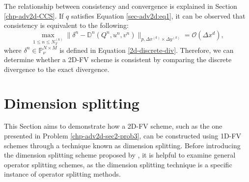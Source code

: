 The relationship between consistency and convergence is explained in Section \ref{chp-adv2d-CCS}.
If $q$ satisfies Equation \eqref{sec-adv2d:eq1}, it can be observed that consistency is equivalent to the following:
\begin{equation*}
	{\max_{1\leq n\leq N_T^{(k)}}}{\|\delta^n - \mathbb{D}^n(Q^n,u^n,v^n)\|_{p,\Delta x^{(k)} \times \Delta y^{(k)}}} = \mathcal{O}(\Delta x^d),
\end{equation*}
where $\delta^n \in \mathbb{P}^{N\times M}_{\nu}$ is defined in Equation \eqref{2d-discrete-div}.
Therefore, we can determine whether a 2D-FV scheme is consistent by comparing the discrete divergence to the exact divergence.

\section{Dimension splitting}
\label{sec-dsplit}
This Section aims to demonstrate how a 2D-FV scheme, such as the one presented in Problem \ref{chp-adv2d-sec2-prob3},
can be constructed using 1D-FV schemes through a technique known as dimension splitting.
Before introducing the dimension splitting scheme proposed by \citet{lin:1996},
it is helpful to examine general operator splitting schemes,
as the dimension splitting technique is a specific instance of operator splitting methods.

